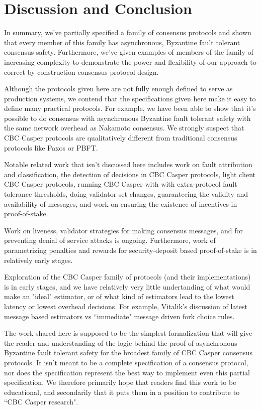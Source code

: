 \section{Discussion and Conclusion}

In summary, we've partially specified a family of consensus protocols and shown that every member of this family has asynchronous, Byzantine fault tolerant consensus safety. Furthermore, we've given examples of members of the family of increasing complexity to demonstrate the power and flexibility of our approach to correct-by-construction consensus protocol design.

Although the protocols given here are not fully enough defined to serve as production systems, we contend that the specifications given here make it easy to define many practical protocols. For example, we have been able to show that it's possible to do consensus with asynchronous Byzantine fault tolerant safety with the same network overhead as Nakamoto consensus. We strongly suspect that CBC Casper protocols are qualitatively different from traditional consensus protocols like Paxos\cite{paxos} or PBFT\cite{Castro_Liskov_1999_pbft}.

Notable related work that isn't discussed here includes work on fault attribution and classification, the detection of decisions in CBC Casper protocols, light client CBC Casper protocols, running CBC Casper with with extra-protocol fault tolerance thresholds, doing validator set changes, guaranteeing the validity and availability of messages, and work on ensuring the existence of incentives in proof-of-stake.

Work on liveness, validator strategies for making consensus messages, and for preventing denial of service attacks is ongoing. Furthermore, work of parametrizing penalties and rewards for security-deposit based proof-of-stake is in relatively early stages. 

Exploration of the CBC Casper family of protocols (and their implementations) is in early stages, and we have relatively very little undertanding of what would make an "ideal" estimator, or of what kind of estimators lead to the lowest latency or lowest overhead decisions. For example, Vitalik's discussion of latest message based estimators vs ``immediate" message driven fork choice rules\cite{vitalik-FFG-CBC-wars-tweet-thread}.

The work shared here is supposed to be the simplest formalization that will give the reader and understanding of the logic behind the proof of asynchronous Byzantine fault tolerant safety for the broadest family of CBC Casper consensus protocols. It isn't meant to be a complete specification of a consensus protocol, nor does the specification represent the best way to implement even this partial specification. We therefore primarily hope that readers find this work to be educational, and secondarily that it puts them in a position to contribute to ``CBC Casper research".
